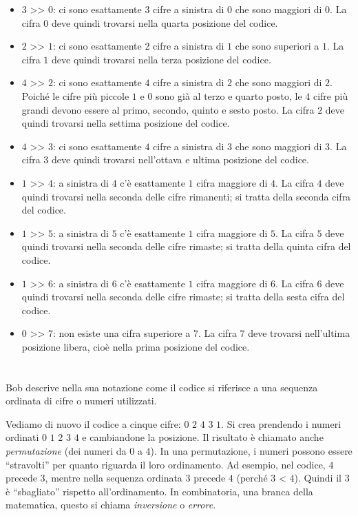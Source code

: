 {{\begin{itemize}
  \item $3$ >\textcompwordmark{}> $0$: ci sono esattamente $3$ cifre a sinistra di $0$ che sono maggiori di $0$.
La cifra $0$ deve quindi trovarsi nella quarta posizione del codice.
  \item $2$ >\textcompwordmark{}> $1$: ci sono esattamente $2$ cifre a sinistra di $1$ che sono superiori a $1$.
La cifra $1$ deve quindi trovarsi nella terza posizione del codice.
  \item $4$ >\textcompwordmark{}> $2$: ci sono esattamente $4$ cifre a sinistra di $2$ che sono maggiori di $2$.
Poiché le cifre più piccole $1$ e $0$ sono già al terzo e quarto posto,
le $4$ cifre più grandi devono essere al primo, secondo, quinto e sesto posto.
La cifra $2$ deve quindi trovarsi nella settima posizione del codice.
  \item $4$ >\textcompwordmark{}> $3$: ci sono esattamente $4$ cifre a sinistra di $3$ che sono maggiori di $3$.
La cifra $3$ deve quindi trovarsi nell’ottava e ultima posizione del codice.
  \item $1$ >\textcompwordmark{}> $4$: a sinistra di $4$ c’è esattamente $1$ cifra maggiore di $4$.
La cifra $4$ deve quindi trovarsi nella seconda delle cifre rimanenti; si tratta della seconda cifra del codice.
  \item $1$ >\textcompwordmark{}> $5$: a sinistra di $5$ c’è esattamente $1$ cifra maggiore di $5$.
La cifra $5$ deve quindi trovarsi nella seconda delle cifre rimaste; si tratta della quinta cifra del codice.
  \item $1$ >\textcompwordmark{}> $6$: a sinistra di $6$ c’è esattamente $1$ cifra maggiore di $6$.
La cifra $6$ deve quindi trovarsi nella seconda delle cifre rimaste; si tratta della sesta cifra del codice.
  \item $0$ >\textcompwordmark{}> $7$: non esiste una cifra superiore a $7$.
La cifra $7$ deve trovarsi nell’ultima posizione libera, cioè nella prima posizione del codice.
\end{itemize}



\section*{\BrochureItsInformatics}
Bob descrive nella sua notazione come il codice si riferisce a una sequenza ordinata di cifre o numeri utilizzati.

Vediamo di nuovo il codice a cinque cifre: $0$ $2$ $4$ $3$ $1$.
Si crea prendendo i numeri ordinati $0$ $1$ $2$ $3$ $4$ e cambiandone la posizione.  Il risultato è chiamato anche \emph{permutazione} (dei numeri da $0$ a $4$).
In una permutazione, i numeri possono essere \enquote{stravolti} per quanto riguarda il loro ordinamento.
Ad esempio, nel codice, $4$ precede $3$, mentre nella sequenza ordinata $3$ precede $4$ (perché $3$ < $4$).
Quindi il $3$ è \enquote{sbagliato} rispetto all’ordinamento. In combinatoria, una branca della matematica, questo si chiama \emph{inversione} o \emph{errore}.

}}
